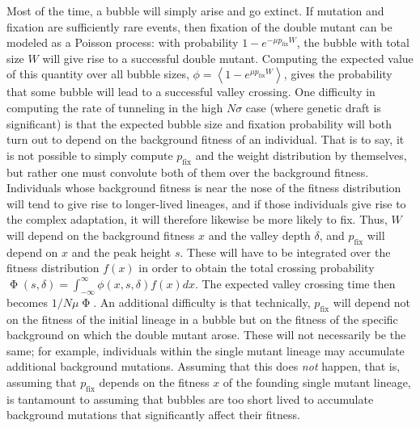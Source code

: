 \documentclass[10pt,twocolumn,twoside]{gsajnl}
\newcommand{\pfix}{p_{\mathrm{fix}}}
\begin{document}
\begin{spacing}{1.5}
Most of the time, a bubble will simply arise and go extinct.
If mutation and fixation are sufficiently rare events, then fixation of the double mutant can be modeled as a Poisson process: with probability $1-e^{-\mu \pfix W}$, the bubble with total size $W$ will give rise to a successful double mutant.
Computing the expected value of this quantity over all bubble sizes, $\phi = \left< 1-e^{\mu \pfix W} \right>$, gives the probability that some bubble will lead to a successful valley crossing.
One difficulty in computing the rate of tunneling in the high $N\sigma$ case (where genetic draft is significant) is that the expected bubble size and fixation probability will both turn out to depend on the background fitness of an individual.
That is to say, it is not possible to simply compute $\pfix$ and the weight distribution by themselves, but rather one must convolute both of them over the background fitness.
Individuals whose background fitness is near the nose of the fitness distribution will tend to give rise to longer-lived lineages, and if those individuals give rise to the complex adaptation, it will therefore likewise be more likely to fix.
Thus, $W$ will depend on the background fitness $x$ and the valley depth $\delta$, and $\pfix$ will depend on $x$ and the peak height $s$.
These will have to be integrated over the fitness distribution $f(x)$ in order to obtain the total crossing probability $\upPhi(s,\delta) = \int_{-\infty}^\infty \phi(x,s,\delta) f(x) dx$.
The expected valley crossing time then becomes $1/N\mu\upPhi$.
An additional difficulty is that technically, $\pfix$ will depend not on the fitness of the initial lineage in a bubble but on the fitness of the specific background on which the double mutant arose.
These will not necessarily be the same; for example, individuals within the single mutant lineage may accumulate additional background mutations.
Assuming that this does \emph{not} happen, that is, assuming that $\pfix$ depends on the fitness $x$ of the founding single mutant lineage, is tantamount to assuming that bubbles are too short lived to accumulate background mutations that significantly affect their fitness.


\end{spacing}
\end{document}
